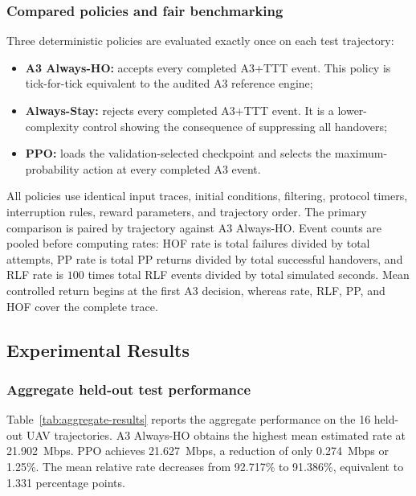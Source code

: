 \subsubsection{Compared policies and fair benchmarking}

Three deterministic policies are evaluated exactly once on each test
trajectory:

\begin{itemize}
    \item \textbf{A3 Always-HO:} accepts every completed A3+TTT event. This
    policy is tick-for-tick equivalent to the audited A3 reference engine;
    \item \textbf{Always-Stay:} rejects every completed A3+TTT event. It is a
    lower-complexity control showing the consequence of suppressing all
    handovers;
    \item \textbf{PPO:} loads the validation-selected checkpoint and selects
    the maximum-probability action at every completed A3 event.
\end{itemize}

All policies use identical input traces, initial conditions, filtering,
protocol timers, interruption rules, reward parameters, and trajectory order.
The primary comparison is paired by trajectory against A3 Always-HO. Event
counts are pooled before computing rates: HOF rate is total failures divided
by total attempts, PP rate is total PP returns divided by total successful
handovers, and RLF rate is $100$ times total RLF events divided by total
simulated seconds. Mean controlled return begins at the first A3 decision,
whereas rate, RLF, PP, and HOF cover the complete trace.

\subsection{Experimental Results}
\label{subsec:experimental-results}

\subsubsection{Aggregate held-out test performance}

Table~\ref{tab:aggregate-results} reports the aggregate performance on the 16
held-out UAV trajectories. A3 Always-HO obtains the highest mean estimated rate
at 21.902~Mbps. PPO achieves 21.627~Mbps, a reduction of only 0.274~Mbps or
1.25\%. The mean relative rate decreases from 92.717\% to 91.386\%, equivalent
to 1.331 percentage points.

